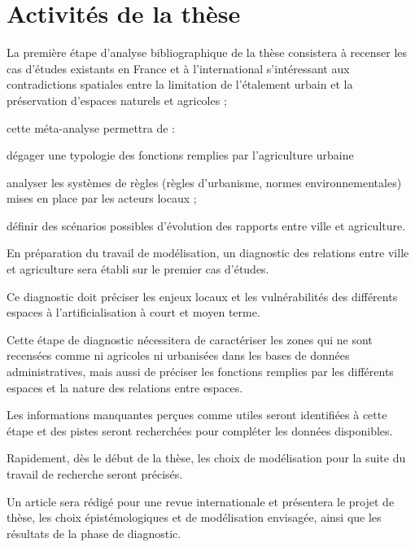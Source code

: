 \section{Activités de la thèse}

\subject{1ère année}

\startitemize[n]

\item	La première étape d'analyse bibliographique de la thèse
	consistera à recenser les cas d'études existants en France et à l'international
	s'intéressant aux contradictions spatiales entre la limitation de l'étalement urbain
	et la préservation d'espaces naturels et agricoles ;

	cette méta-analyse permettra de :

	\startitemize[a,packed]

	\item dégager une typologie des fonctions remplies par l'agriculture urbaine
	\item analyser les systèmes de règles (règles d'urbanisme,
		normes environnementales) mises en place par les acteurs locaux ;
		\item définir des scénarios possibles d'évolution
	  des rapports entre ville et agriculture.

	\stopitemize

\item	En préparation du travail de modélisation,
	un diagnostic des relations entre ville et agriculture
	sera établi sur le premier cas d'études.

	Ce diagnostic doit préciser les enjeux locaux
	et les vulnérabilités des différents espaces
	à l'artificialisation à court et moyen terme.

	Cette étape de diagnostic nécessitera de caractériser les zones
	qui ne sont recensées comme ni agricoles ni urbanisées
	dans les bases de données administratives,
	mais aussi de préciser les fonctions remplies par les différents espaces
	et la nature des relations entre espaces.

	Les informations manquantes perçues comme utiles
	seront identifiées à cette étape et des pistes seront recherchées
	pour compléter les données disponibles.

\item Rapidement, dès le début de la thèse,
	les choix de modélisation pour la suite du travail de recherche
	seront précisés.

\item Un article sera rédigé pour une revue internationale
   et présentera le projet de thèse,
   les choix épistémologiques et de modélisation envisagée,
   ainsi que les résultats de la phase de diagnostic.

